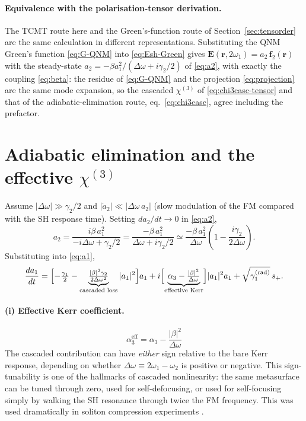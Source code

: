 \documentclass[11pt,a4paper]{article}
\newcommand{\bvec}[1]{\mathbf{#1}}
\newcommand{\f}{\bvec{f}}
\newcommand{\ri}{\bvec{r}}
\newcommand{\chithree}{\chi^{(3)}}
\newcommand{\Dom}{\Delta\omega}
\begin{document}
\paragraph{Equivalence with the polarisation-tensor derivation.}
The TCMT route here and the Green's-function route of
Section~\ref{sec:tensorder} are the same calculation in different
representations.  Substituting the QNM Green's function
\eqref{eq:G-QNM} into \eqref{eq:Esh-Green} gives
$\mathbf E(\ri,2\omega_1)=a_2\,\f_2(\ri)$ with the steady-state
$a_2=-\beta a_1^{2}/(\Dom+i\gamma_2/2)$ of \eqref{eq:a2}, with
exactly the coupling \eqref{eq:beta}: the residue of \eqref{eq:G-QNM}
and the projection \eqref{eq:projection} are the same mode expansion,
so the cascaded $\chithree$ of \eqref{eq:chi3casc-tensor} and that of the
adiabatic-elimination route, eq.~\eqref{eq:chi3casc}, agree including
the prefactor.

\section{Adiabatic elimination and the effective $\chithree$}\label{sec:adiab}

Assume $|\Dom|\gg\gamma_2/2$ and $|\dot a_2|\ll|\Dom\,a_2|$ (slow
modulation of the FM compared with the SH response time).  Setting
$da_2/dt\to 0$ in \eqref{eq:a2},
\begin{equation}
  a_2 = \frac{i\beta\,a_1^2}{-i\Dom+\gamma_2/2}
      = \frac{-\beta\,a_1^2}{\Dom+i\gamma_2/2}
      \simeq \frac{-\beta\,a_1^2}{\Dom}\!\left(1-\frac{i\gamma_2}{2\Dom}\right).
\end{equation}
Substituting into \eqref{eq:a1},
\begin{equation}
  \frac{da_1}{dt}=
   \Bigl[-\tfrac{\gamma_1}{2}-\underbrace{\tfrac{|\beta|^2\gamma_2}{2\Dom^{2}}}_{\text{cascaded loss}}|a_1|^2\Bigr]a_1
   +i\Bigl[\underbrace{\alpha_3-\tfrac{|\beta|^2}{\Dom}}_{\text{effective Kerr}}\Bigr]|a_1|^2 a_1
   +\sqrt{\gamma_1^{(\text{rad})}}\,s_+ .
\end{equation}

\paragraph{(i) Effective Kerr coefficient.}
\begin{equation}
  \boxed{\;\alpha_3^{\text{eff}}=\alpha_3-\frac{|\beta|^2}{\Dom}\;}
\end{equation}
The cascaded contribution can have \emph{either} sign relative to the
bare Kerr response, depending on whether $\Dom\equiv 2\omega_1-\omega_2$
is positive or negative.  This sign-tunability is one of the hallmarks
of cascaded nonlinearity: the same metasurface can be tuned through
zero, used for self-defocusing, or used for self-focusing simply by
walking the SH resonance through twice the FM frequency.  This was used
dramatically in soliton compression experiments \cite{DeSalvo1992,Liu1999}.
\end{document}
